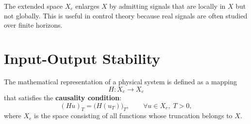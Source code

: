 \begin{remark}
The extended space $X_e$ enlarges $X$ by admitting signals that are locally in $X$ but not globally.  
This is useful in control theory because real signals are often studied over finite horizons.
\end{remark}

\section{Input-Output Stability}

\begin{definition}[Mapping]
The mathematical representation of a physical system is defined as a mapping
\begin{equation}
H: X_e \to X_e
\end{equation}
that satisfies the \textbf{causality condition}:
\begin{equation}
(Hu)_T = \big(H(u_T)\big)_T, \qquad \forall u \in X_e, \; T>0,
\end{equation}
where $X_e$ is the space consisting of all functions whose truncation belongs to $X$.
\end{definition}

